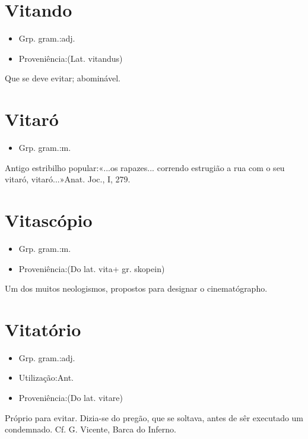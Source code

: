 \documentclass{article}
\begin{document}
\section{Vitando}
\begin{itemize}
\item {Grp. gram.:adj.}
\end{itemize}
\begin{itemize}
\item {Proveniência:(Lat. \textunderscore vitandus\textunderscore )}
\end{itemize}
Que se deve evitar; abominável.
\section{Vitaró}
\begin{itemize}
\item {Grp. gram.:m.}
\end{itemize}
Antigo estribilho popular:«\textunderscore ...os rapazes... correndo estrugião a rua com o seu vitaró, vitaró...\textunderscore »\textunderscore Anat. Joc.\textunderscore , I, 279.
\section{Vitascópio}
\begin{itemize}
\item {Grp. gram.:m.}
\end{itemize}
\begin{itemize}
\item {Proveniência:(Do lat. \textunderscore vita\textunderscore  + gr. \textunderscore skopein\textunderscore )}
\end{itemize}
Um dos muitos neologismos, propostos para designar o cinematógrapho.
\section{Vitatório}
\begin{itemize}
\item {Grp. gram.:adj.}
\end{itemize}
\begin{itemize}
\item {Utilização:Ant.}
\end{itemize}
\begin{itemize}
\item {Proveniência:(Do lat. \textunderscore vitare\textunderscore )}
\end{itemize}
Próprio para evitar.
Dizia-se do pregão, que se soltava, antes de sêr executado um condemnado. Cf. G. Vicente, \textunderscore Barca do Inferno\textunderscore .
\end{document}
